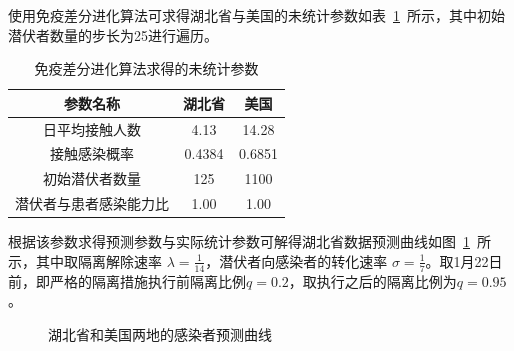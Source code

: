 \documentclass{whutmod}
\begin{document}
        使用免疫差分进化算法可求得湖北省与美国的未统计参数如表~\ref{sdf}~所示，其中初始潜伏者数量的步长为25进行遍历。
        
        	\begin{table}[H]
        	\centering		
        	\caption{免疫差分进化算法求得的未统计参数}\label{sdf}
        	\begin{tabular}{ccc}
        		\toprule[2pt]
        		\multicolumn{1}{m{5cm}}{\centering 参数名称}
        		& \multicolumn{1}{m{4cm}}{\centering 湖北省}
        		& \multicolumn{1}{m{4cm}}{\centering 美国}
        		\\
        		\midrule[1pt]
        	日平均接触人数&   4.13& 14.28\\ 
        	接触感染概率& 0.4384	& 0.6851\\ 
        	初始潜伏者数量& 	125& 1100\\ 
        	潜伏者与患者感染能力比& 1.00&1.00\\
        		\bottomrule[2pt]	
        	\end{tabular}
		\end{table}
        
        根据该参数求得预测参数与实际统计参数可解得湖北省数据预测曲线如图~\ref{sd}~所示，其中取隔离解除速率 $\lambda =\frac{1}{14}$，潜伏者向感染者的转化速率 $\sigma=\frac{1}{7}$。取1月22日前，即严格的隔离措施执行前隔离比例$q=0.2$，取执行之后的隔离比例为$q=0.95$。
        \begin{figure}[H]
	\centering
	\caption{湖北省和美国两地的感染者预测曲线}\label{sd}
\end{figure}
\end{document}
